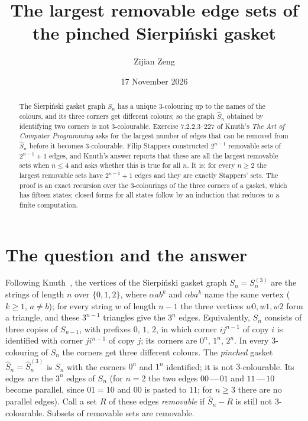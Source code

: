 \documentclass[11pt]{amsart}
\theoremstyle{remark}
\newcommand{\Sh}{\widehat S}
\begin{document}
\title[Removable edges of the pinched Sierpi\'nski gasket]{The largest removable edge sets of the pinched Sierpi\'nski gasket}
\author{Zijian Zeng}
\address{UCSI University, Kuala Lumpur, Malaysia}
\date{17 November 2026}
\begin{abstract}
The Sierpi\'nski gasket graph $S_n$ has a unique $3$-colouring up to the names of the colours, and its three
corners get different colours; so the graph $\Sh_n$ obtained by identifying two corners is not $3$-colourable.
Exercise 7.2.2.3--227 of Knuth's \emph{The Art of Computer Programming} asks for the largest number of edges that
can be removed from $\Sh_n$ before it becomes $3$-colourable. Filip Stappers constructed $2^{n-1}$ removable sets
of $2^{n-1}+1$ edges, and Knuth's answer reports that these are all the largest removable sets when $n\le4$ and asks
whether this is true for all $n$. It is: for every $n\ge2$ the largest removable sets have $2^{n-1}+1$ edges and
they are exactly Stappers' sets. The proof is an exact recursion over the $3$-colourings of the three corners of a
gasket, which has fifteen states; closed forms for all states follow by an induction that reduces to a finite
computation.
\end{abstract}
\maketitle

\section{The question and the answer}
Following Knuth~\cite[\S7.2.2.3]{knuth7}, the vertices of the Sierpi\'nski gasket graph $S_n=S^{(3)}_n$ are the
strings of length $n$ over $\{0,1,2\}$, where $\alpha ab^k$ and $\alpha ba^k$ name the same vertex ($k\ge1$,
$a\ne b$); for every string $w$ of length $n-1$ the three vertices $w0,w1,w2$ form a triangle, and these
$3^{n-1}$ triangles give the $3^n$ edges. Equivalently, $S_n$ consists of three copies of $S_{n-1}$, with prefixes
$0$, $1$, $2$, in which corner $ij^{n-1}$ of copy $i$ is identified with corner $ji^{n-1}$ of copy $j$; its
corners are $0^n$, $1^n$, $2^n$. In every $3$-colouring of $S_n$ the corners get three different colours. The
\emph{pinched} gasket $\Sh_n=\Sh^{(3)}_n$ is $S_n$ with the corners $0^n$ and $1^n$ identified; it is not
$3$-colourable. Its edges are the $3^n$ edges of $S_n$ (for $n=2$ the two edges $00\,\text{---}\,01$ and
$11\,\text{---}\,10$ become parallel, since $01=10$ and $00$ is pasted to $11$; for $n\ge3$ there are no parallel
edges). Call a set $R$ of these edges \emph{removable} if $\Sh_n-R$ is still not $3$-colourable. Subsets of
removable sets are removable.
\end{document}
